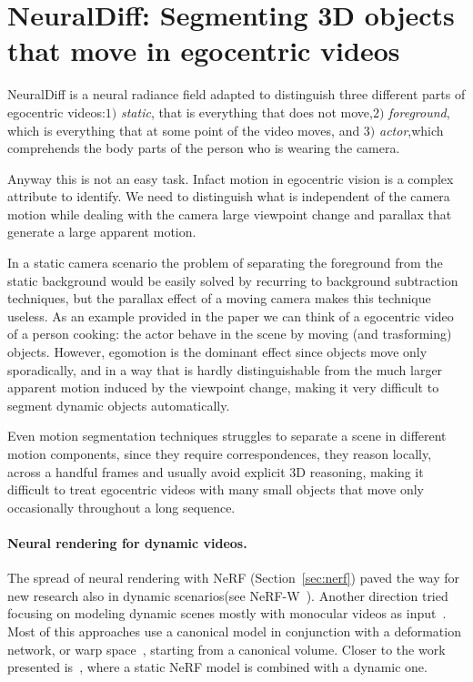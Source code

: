 \section{NeuralDiff: Segmenting 3D objects that move in egocentric videos}
NeuralDiff is a neural radiance field adapted to distinguish three different parts of
egocentric videos:$1)$ \textit{static}, that is everything that does not move,$2)$
\textit{foreground}, which is everything that at some point of the video moves, 
and $3)$ \textit{actor},which comprehends the body parts of the person who 
is wearing the camera. 

Anyway this is not an easy task. Infact motion in egocentric vision is a 
complex attribute to identify. We need to distinguish what is 
independent of the camera motion while dealing with the camera large 
viewpoint change and parallax that generate a large apparent motion.

In a static camera scenario the problem of separating the foreground from
the static background would be easily solved by recurring to 
background subtraction techniques, but the parallax effect of a moving camera makes 
this technique useless. As an example provided in the paper we can think of a egocentric
video of a person cooking: the actor behave in the scene by moving (and trasforming) objects.
However, egomotion is the dominant effect since objects move only sporadically,
and in a way that is hardly distinguishable from the much larger apparent motion induced 
by the viewpoint change, making it very difficult to segment dynamic objects automatically.

Even motion segmentation techniques struggles to separate  a scene in different motion components,
since they require correspondences, they reason locally, across a handful frames and usually
avoid explicit 3D reasoning, making it difficult to treat egocentric videos with many small
objects that move only occasionally throughout a long sequence.

\paragraph{Neural rendering for dynamic videos.}
The spread of neural rendering with NeRF (Section~\ref{sec:nerf}) paved the way 
for new research also in dynamic scenarios(see NeRF-W~\cite{ndiff_17}). 
Another direction tried focusing on modeling dynamic scenes mostly with monocular 
videos as input~\cite{ndiff_15,ndiff_34}. Most of this approaches use a 
canonical model in conjunction with a deformation network, or warp space~\cite{ndiff_34},
starting from a canonical volume. Closer to the work presented is~\cite{ndiff_15},
where a static NeRF model is combined with a dynamic one.


